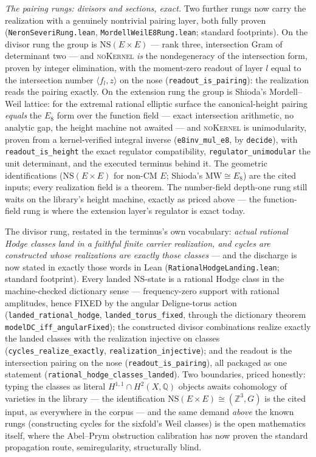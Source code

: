 \documentclass[11pt]{article}
\theoremstyle{definition}
\theoremstyle{remark}
\begin{document}
\emph{The pairing rungs: divisors and sections, exact.}  Two further rungs
now carry the realization with a genuinely nontrivial pairing layer, both
fully proven (\texttt{NeronSeveriRung.lean},
\texttt{MordellWeilE8Rung.lean}; standard footprints).  On the divisor
rung the group is $\mathrm{NS}(E\times E)$ --- rank three, intersection
Gram of determinant two --- and \textsc{noKernel} \emph{is} the
nondegeneracy of the intersection form, proven by integer elimination,
with the moment-zero readout of layer $l$ equal to the intersection
number $\langle f_l, z\rangle$ on the nose
(\texttt{readout\_is\_pairing}): the realization reads the pairing
exactly.  On the extension rung the group is Shioda's Mordell--Weil
lattice: for the extremal rational elliptic surface the canonical-height
pairing \emph{equals} the $E_8$ form over the function field
\cite{Shioda90} --- exact intersection arithmetic, no analytic gap, the
height machine not awaited --- and \textsc{noKernel} is unimodularity,
proven from a kernel-verified integral inverse (\texttt{e8inv\_mul\_e8},
by \texttt{decide}), with \texttt{readout\_is\_height} the exact
regulator compatibility, \texttt{regulator\_unimodular} the unit
determinant, and the executed terminus behind it.  The geometric
identifications ($\mathrm{NS}(E\times E)$ for non-CM $E$; Shioda's
$\mathrm{MW}\cong E_8$) are the cited inputs; every realization field is
a theorem.  The number-field depth-one rung still waits on the library's
height machine, exactly as priced above --- the function-field rung is
where the extension layer's regulator is exact today.

The divisor rung, restated in the terminus's own vocabulary: \emph{actual
rational Hodge classes land in a faithful finite carrier realization, and
cycles are constructed whose realizations are exactly those classes} ---
and the discharge is now stated in exactly those words in Lean
(\texttt{RationalHodgeLanding.lean}; standard footprint).  Every landed
NS-state is a rational Hodge class in the machine-checked dictionary
sense --- frequency-zero support with rational amplitudes, hence FIXED by
the angular Deligne-torus action
(\texttt{landed\_rational\_hodge}, \texttt{landed\_torus\_fixed}, through
the dictionary theorem \texttt{modelDC\_iff\_angularFixed}); the
constructed divisor combinations realize exactly the landed classes with
the realization injective on classes (\texttt{cycles\_realize\_exactly},
\texttt{realization\_injective}); and the readout is the intersection
pairing on the nose (\texttt{readout\_is\_pairing}), all packaged as one
statement (\texttt{rational\_hodge\_classes\_landed}).  Two boundaries,
priced honestly: typing the classes as literal
$H^{1,1}\cap H^2(X,\mathbb Q)$ objects awaits cohomology of varieties in
the library --- the identification $\mathrm{NS}(E\times E)\cong(\mathbb
Z^3,G)$ is the cited input, as everywhere in the corpus --- and the same
demand \emph{above} the known rungs (constructing cycles for the
sixfold's Weil classes) is the open mathematics itself, where the
Abel--Prym obstruction calibration has now proven the standard
propagation route, semiregularity, structurally blind.
\end{document}
